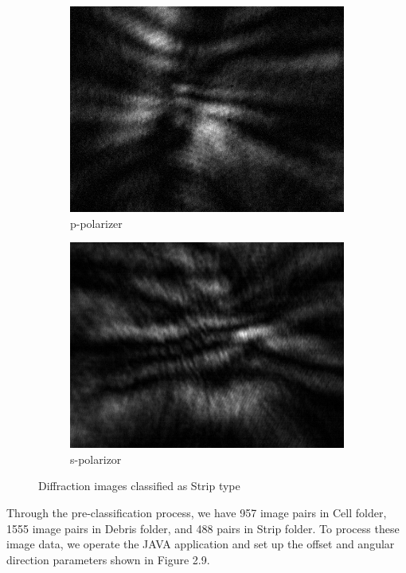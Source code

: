 \begin{figure}[!h]
\begin{subfigure}[b]{0.2\textwidth}
    \includegraphics[width=\textwidth]{diffraction_image/2015040117594700158-1}
    \caption{p-polarizer}
  \end{subfigure}
  \begin{subfigure}[b]{0.2\textwidth}
    \includegraphics[width=\textwidth]{diffraction_image/2015040117594700158-2}
    \caption{s-polarizor}
  \end{subfigure}
  \caption{Diffraction images classified as Strip type}
\end{figure}
Through the pre-classification process, we have 957 image pairs in Cell folder, 1555 image pairs in Debris folder, and 488 pairs in Strip folder. To process these image data, we operate the JAVA application and set up the offset and angular direction parameters shown in Figure 2.9. 
